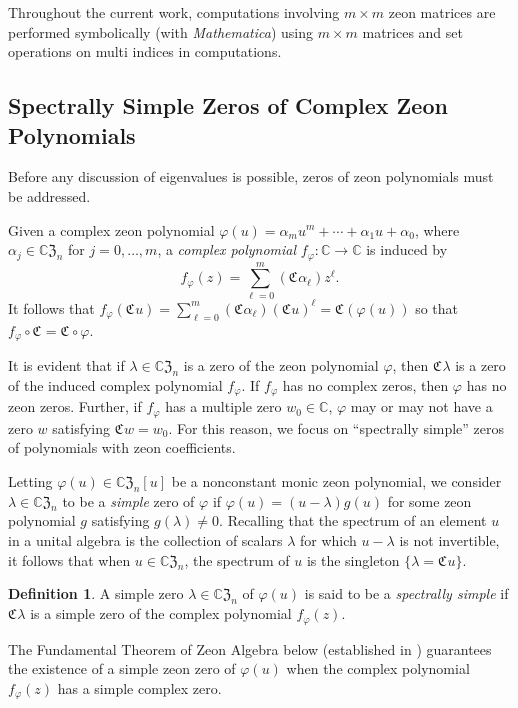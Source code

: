 \documentclass{article}
\theoremstyle{definition}
\newtheorem{definition}[theorem]{Definition}
\newcommand{\zco}{\mathfrak{C}\mspace{1mu}}
\newcommand{\CZ}{\mathbb{C}\mathfrak{Z}}
\numberwithin{equation}{section}
\begin{document}
Throughout the current work, computations involving  $m\times m$ zeon matrices are performed symbolically (with {\em Mathematica}) using $m\times m$ matrices and set operations on multi indices in computations.  

\subsection{Spectrally Simple Zeros of Complex Zeon Polynomials}\label{zeon zeros}

Before any discussion of eigenvalues is possible, zeros of zeon polynomials must be addressed.  

Given a complex zeon polynomial $\varphi(u)=\alpha_m u^m+\cdots+\alpha_1 u+\alpha_0$, where $\alpha_j\in\CZ_n$ for $j=0, \ldots, m$, a {\em complex polynomial} $f_\varphi:\mathbb{C}\to\mathbb{C}$ is induced by \begin{equation*}
f_\varphi(z)=\sum_{\ell=0}^m (\zco \alpha_\ell) z^\ell.
\end{equation*}
It follows that $f_\varphi(\zco u)=\sum_{\ell=0}^m (\zco \alpha_\ell) (\zco u)^\ell=\zco(\varphi(u))$ so that $f_\varphi\circ\zco=\zco\circ \varphi$.  

It is evident that if $\lambda\in\CZ_n$ is a zero of the zeon polynomial $\varphi$, then $\zco\lambda$ is a zero of the induced complex polynomial $f_\varphi$.  If $f_\varphi$ has no complex zeros, then $\varphi$ has no zeon zeros.  Further, if $f_\varphi$ has a multiple zero $w_0\in\mathbb{C}$, $\varphi$ may or may not have a zero $w$ satisfying $\zco w=w_0$.   For this reason, we focus on ``spectrally simple'' zeros of polynomials with zeon coefficients.  

Letting $\varphi(u)\in{\CZ_n}[u]$ be a nonconstant monic zeon polynomial, we consider $\lambda\in{\CZ_n}$ to be a {\em simple} zero of $\varphi$ if $\varphi(u)=(u-\lambda)g(u)$ for some zeon polynomial $g$ satisfying $g(\lambda)\ne 0$.  Recalling that the spectrum of an element $u$ in a unital algebra is the collection of scalars $\lambda$ for which $u-\lambda$ is not invertible, it follows that when $u\in\CZ_n$, the spectrum of $u$ is the singleton $\{\lambda=\zco u\}$.  

\begin{definition}
A simple zero $\lambda\in{\CZ_n}$ of $\varphi(u)$ is said to be a {\em spectrally simple} if $\zco \lambda$ is a simple zero of the complex polynomial $f_\varphi(z)$.
\end{definition}  

The Fundamental Theorem of Zeon Algebra below (established in \cite{simplezeonzeros}) guarantees the existence of a simple  zeon zero of $\varphi(u)$ when the complex polynomial $f_\varphi(z)$ has a simple complex zero.
\end{document}
